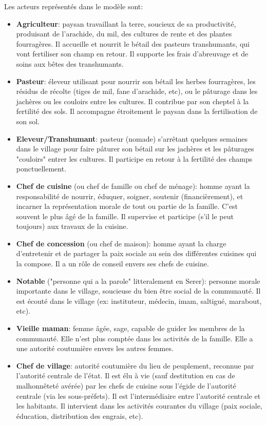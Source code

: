 Les acteurs représentés dans le modèle sont:
\begin{itemize}
  \item \textbf{Agriculteur}: paysan travaillant la terre, soucieux de sa productivité, produisant de l'arachide, du mil, des cultures de rente et des plantes fourragères. Il accueille et nourrit le bétail des pasteurs transhumants, qui vont fertiliser son champ en retour. Il supporte les frais d'abreuvage et de soins aux bêtes des transhumants.
  \item \textbf{Pasteur}: éleveur utilisant pour nourrir son bétail les herbes fourragères, les résidus de récolte (tiges de mil, fane d'arachide, etc), ou le pâturage dans les jachères ou les couloirs entre les cultures. Il contribue par son cheptel à la fertilité des sols. Il accompagne étroitement le paysan dans la fertilisation de son sol.
  \item \textbf{Eleveur/Transhumant}: pasteur (nomade) s'arrêtant quelques semaines dans le village pour faire pâturer son bétail sur les jachères et les pâturages "couloirs" entrer les cultures. Il participe en retour à la fertilité des champs ponctuellement.
  \item \textbf{Chef de cuisine} (ou chef de famille ou chef de ménage): homme ayant la responsabilité de nourrir, éduquer, soigner, soutenir (financièrement), et incarner la représentation morale de tout ou partie de la famille. C'est souvent le plus âgé de la famille. Il supervise et participe (s'il le peut toujours) aux travaux de la cuisine.
  \item \textbf{Chef de concession} (ou chef de maison): homme ayant la charge d'entretenir et de partager la paix sociale au sein des différentes cuisines qui la compose. Il a un rôle de conseil envers ses chefs de cuisine.
  \item \textbf{Notable} ("personne qui a la parole" litteralement en Serer): personne morale importante dans le village, soucieuse du bien être social de la communauté. Il est écouté dans le village (ex: instituteur, médecin, imam, saltigué, marabout, etc).
  \item \textbf{Vieille maman}:  femme âgée, sage, capable de guider les membres de la communauté. Elle n'est plus comptée dans les activités de la famille. Elle a une autorité coutumière envers les autres femmes.
  \item \textbf{Chef de village}: autorité coutumière du lieu de peuplement, reconnue par l'autorité centrale de l'état. Il est élu à vie (sauf destitution en cas de malhonnêteté avérée) par les chefs de cuisine sous l'égide de l'autorité centrale (via les sous-préfets). Il est l'intermédiaire entre l'autorité centrale et les habitants. Il intervient dans les activités courantes du village (paix sociale, éducation, distribution des engrais, etc).

\end{itemize}
